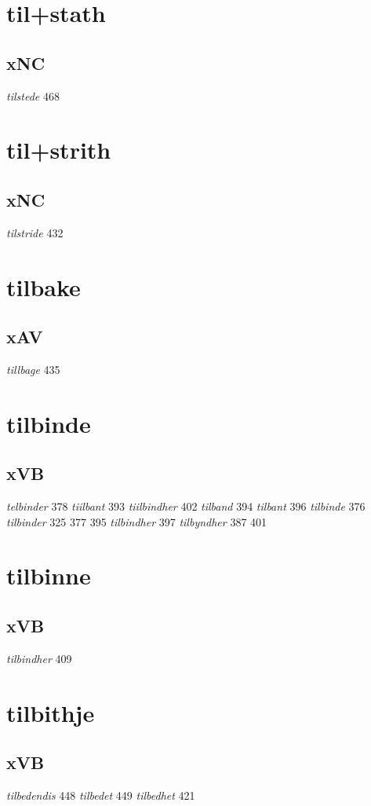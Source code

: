 \documentclass[a4paper,twocolumn]{article}
\begin{document}
\section{til+stath}
\label{sec:orgda4931e}
\subsection{xNC}
\label{sec:orge182d5b}
\emph{tilstede} 468 
\section{til+strith}
\label{sec:org137b783}
\subsection{xNC}
\label{sec:orgbb31283}
\emph{tilstride} 432 
\section{tilbake}
\label{sec:orge261feb}
\subsection{xAV}
\label{sec:org46b6441}
\emph{tillbage} 435 
\section{tilbinde}
\label{sec:orgb893931}
\subsection{xVB}
\label{sec:org29e2646}
\emph{telbinder} 378 \emph{tiilbant} 393 \emph{tiilbindher} 402 \emph{tilband} 394 \emph{tilbant} 396 \emph{tilbinde} 376 \emph{tilbinder} 325 377 395 \emph{tilbindher} 397 \emph{tilbyndher} 387 401 
\section{tilbinne}
\label{sec:org50b2875}
\subsection{xVB}
\label{sec:org6a859c8}
\emph{tilbindher} 409 
\section{tilbithje}
\label{sec:orga24cfd5}
\subsection{xVB}
\label{sec:orgb041be1}
\emph{tilbedendis} 448 \emph{tilbedet} 449 \emph{tilbedhet} 421 
\end{document}
